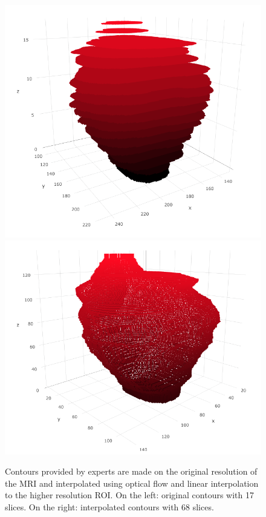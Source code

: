 \begin{figure}[h]
    \centering
    \includegraphics[totalheight=.15\textheight]{imgs/methodology/OF_1.png}
    \includegraphics[totalheight=.15\textheight]{imgs/methodology/OF_2.png}
    \caption{Contours provided by experts are made on the
    original resolution of the MRI and interpolated using optical flow and
    linear interpolation to the higher resolution ROI. On the left: original contours with 17 slices. On the right: interpolated contours with 68 slices.}
    \label{fig:of1}
\end{figure}

